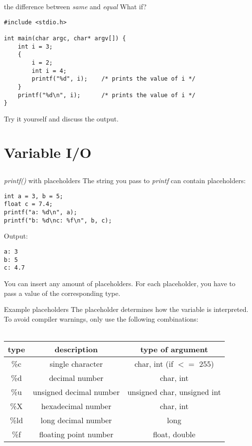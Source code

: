 \begin{frame}[fragile]{the difference between \textit{same} and \textit{equal}}
	What if?
	\begin{lstlisting}
#include <stdio.h>

int main(char argc, char* argv[]) {
	int i = 3;
	{
		i = 2;
		int i = 4;
		printf("%d", i);	/* prints the value of i */
	}
	printf("%d\n", i);		/* prints the value of i */
}
\end{lstlisting}
	Try it yourself and discuss the output.
\end{frame}
\section{Variable I/O}
\subsection{}
\begin{frame}[fragile]{\textit{printf()} with placeholders}
	The string you pass to \textit{printf} can contain placeholders:
	\begin{lstlisting}[numbers=none]
int a = 3, b = 5;
float c = 7.4;
printf("a: %d\n", a);
printf("b: %d\nc: %f\n", b, c);
\end{lstlisting}
Output:\begin{lstlisting}[numbers=none]
a: 3
b: 5
c: 4.7
\end{lstlisting}
You can insert any amount of placeholders. For each placeholder, you have to pass a value of the corresponding type.
\end{frame}
\begin{frame}{Example placeholders}
	The placeholder determines how the variable is interpreted.
	To avoid compiler warnings, only use the following combinations: \\ \ \\
	\begin{tabular}{|c|c|c|}
		\hline
		\textbf{type} & \textbf{description} & \textbf{type of argument} \\\hline
		\%c & single character & char, int (if $<=$ 255) \\\hline
		\%d & decimal number & char, int \\\hline
		\%u & unsigned decimal number & unsigned char, unsigned int \\\hline
		\%X & hexadecimal number & char, int \\\hline
		\%ld & long decimal number & long \\\hline
		\%f & floating point number & float, double \\\hline
	\end{tabular}
\end{frame}
